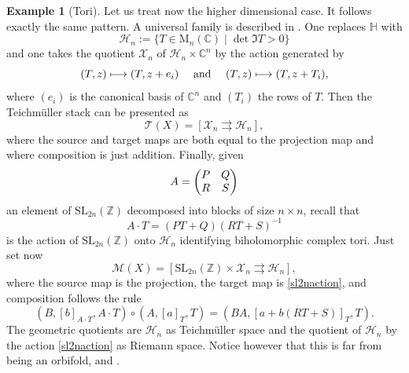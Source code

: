 \documentclass[JEP,XML,SOM,Unicode]{cedram}
\let\mathcal\mathscr
\def\mto{\mathchoice{\longmapsto}{\mapsto}{\mapsto}{\mapsto}}
\newcommand{\SL}{\mathrm{SL}}
\theoremstyle{plain}
\theoremstyle{definition}
\newtheorem{example}[theorem]{Example}
\theoremstyle{remark}
\numberwithin{equation}{section}
\newcommand{\CC}{{\mathbb{C}}}
\begin{document}
\begin{example}[Tori]
Let us treat now the higher dimensional case. It follows exactly the same pattern. A universal family is described in \cite[\S 5.2]{KodairaBook}. One replaces $\mathbb H$ with
\begin{equation}
\label{hdH}
\mathcal H_n:=\{T\in \text{M}_n(\CC)\mid \det \Im T >0\}
\end{equation}
and one takes the quotient $\mathcal X_n$ of $\mathcal H_n\times \CC^n$ by the action generated by
\begin{equation}
\label{hdtoriTeich}
(T,z)\mto (T, z+e_i)\quad\text{ and }\quad(T,z)\mto (T, z+T_i),
\end{equation}
where $(e_i)$ is the canonical basis of $\CC^n$ and $(T_i)$ the rows of $T$. Then the Teichmüller stack can be presented as
\begin{equation}
\label{hdtoriTgroupoid}
\mathcal T(X)=\left [\mathcal X_n\rightrightarrows \mathcal H_n\right],
\end{equation}
where the source and target maps are both equal to the projection map and where composition is just addition. Finally, given
\begin{equation}
\label{matrixAn}
A=\begin{pmatrix}
P &Q\cr
R &S
\end{pmatrix}
\end{equation}
an element of $\SL_{2n}(\mathbb Z)$ decomposed into blocks of size $n\times n$, recall that
\begin{equation}
\label{sl2naction}
A\cdot T=(PT+Q)(RT+S)^{-1}
\end{equation}
is the action of $\SL_{2n}(\mathbb Z)$ onto $\mathcal H_n$ identifying biholomorphic complex tori.
Just set now\vspace*{-3pt}
\begin{equation}
\label{hdtoriMgroupoid}
\mathcal M(X)=\left[\SL_{2n}(\mathbb Z)\times\mathcal X_n\rightrightarrows \mathcal H_n\right ],
\end{equation}
where the source map is the projection, the target map is \eqref{sl2naction}, and composition follows the rule\vspace*{-3pt}\enlargethispage{.5\baselineskip}%
\begin{equation}
\label{hdcomptori}
(B,[b]_{A\cdot T},A\cdot T)\circ (A,[a]_T, T)=(BA,[a+b(RT+S)]_T, T).
\end{equation}
The geometric quotients are $\mathcal H_n$ as Teichmüller space and the quotient of $\mathcal H_n$ by the action \eqref{sl2naction} as Riemann space. Notice however that this is far from being an orbifold, \cf \cite[\S 5.2]{KodairaBook} and \cite{VerbitskyErgodic}.
\end{example}
\end{document}
